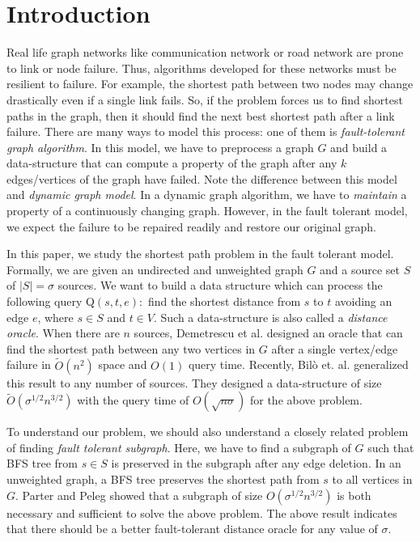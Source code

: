 \section{Introduction}
Real life graph networks like communication network or road
network are prone to link or node failure. Thus, algorithms
developed for these networks must be resilient to failure.
For example, the shortest path between two nodes may change
drastically even if a single link fails. So, if the problem
forces us to find shortest paths in the graph, then it should
find the next best shortest path after a link failure. There
are many ways to model this process: one of them is {\em
fault-tolerant graph algorithm}. In this model,  we have to preprocess a graph $G$  and
build a data-structure that can compute a property of the
graph after any $k$ edges/vertices of the graph have failed.
 Note the difference between this model and
{\em dynamic graph model}. In a dynamic graph algorithm,
 we have to {\em maintain} a property of a continuously
changing graph. However,
in the fault tolerant model, we expect the failure to be
repaired readily and
restore our original graph.

In this paper, we study the shortest path problem in the
fault tolerant model. Formally, we are given an undirected
and unweighted graph $G$ and a source
set $S$ of $|S| = \sigma
$ sources. We want to build a data structure which can process
the following query {\sc Q}$(s,t,e):$ find the shortest
distance from $s$ to $t$ avoiding an edge $e$,  where $s
\in S$ and
$t \in V$. Such a data-structure is also called a {\em distance
oracle}.
When there are $n$ sources, Demetrescu et al. \cite{DemetrescuTCR08}
designed an oracle that can find the shortest path between
any two vertices
in $G$ after a single vertex/edge failure in $\tilde O(n^2)$
space and $O(1)$
query time. Recently,
Bil{\`o} et. al. \cite{BiloCGLP17} generalized this result
to any number of sources. They designed a data-structure
of size $\tilde
O(\sigma^{1/2}n^{3/2})$ with the query time of $O(\sqrt{n\sigma})$
for the above problem.

To understand our problem, we should also understand a closely
related problem of finding
{\em fault tolerant subgraph}.
Here, we have to find a subgraph of $G$ such that BFS
tree from $s \in S$ is preserved in the subgraph after any
edge
deletion.  In an unweighted graph, a BFS tree preserves
the shortest path from $s$ to all vertices in $G$.
Parter and Peleg \cite{ParterP13} showed that a subgraph
of
size $O(\sigma^{1/2} n^{3/2})$ is both necessary and sufficient
to
solve the above problem. The above result indicates that
there should
be a better fault-tolerant distance oracle for any value
of $\sigma$.

